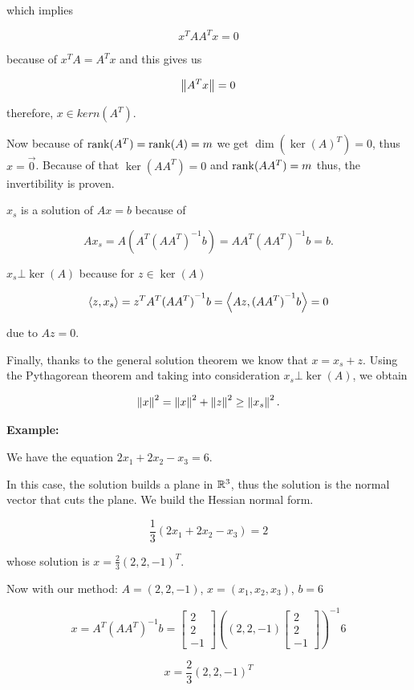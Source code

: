 which implies 

\[
	x^T AA^T x = 0
\] 

because of \(x^T A = A^T x\) and this gives us 

\[
	\left\| A^T x \right\| = 0
\] 

therefore, \(x \in kern(A^T)\).

Now because of \(\mathrm{rank}(A^T) = \mathrm{rank}(A) = m\) we get \(\dim(\ker(A)^T) = 0\), thus \(x = \vec{0}\). 
Because of that \(\ker(A A^T) = 0\) and \(\mathrm{rank}(AA^T) = m\) thus, the invertibility is proven.

\(x_s\) is a solution of \(Ax = b\) because of 

\[
	Ax_s = A(A^T {(A A^T)}^{-1} b) = AA^T {(A A^T)}^{-1} b = b.
\]

\(x_s \bot \ker(A)\) because for \(z \in \ker(A)\)

\[
	\left\langle z, x_s\right\rangle = z^T A^T {(A A^T)}^{-1} b = \left\langle Az, {(A A^T)}^{-1} b\right\rangle = 0
\]

due to \(Az = 0\).

Finally, thanks to the general solution theorem we know that \(x = x_s + z\). Using the Pythagorean theorem and 
taking into consideration \(x_s \bot \ker(A)\), we obtain

\[
	\left\| x \right\|^2 = \left\| x \right\|^2 + \left\| z \right\|^2 \ge \left\| x_s \right\|^2.
\]

\textbf{Example:}

We have the equation \(2x_1 + 2x_2 - x_3 = 6\).

In this case, the solution builds a plane in \(\mathbb{R}^3\), thus the solution is the normal vector that 
cuts the plane. We build the Hessian normal form.

\[
	\frac{1}{3} (2x_1 + 2x_2 - x_3) = 2
\]

whose solution is \(x = \frac{2}{3}(2, 2, -1)^T\).

Now with our method: \(A = (2, 2, -1)\), \(x = (x_1, x_2, x_3)\), \(b = 6\)

\[
	x = A^T {(AA^T)}^{-1} b =
	\begin{bmatrix}
	2\\
	2\\
	-1
	\end{bmatrix}
	{\left(
		(2,2,-1)
	\begin{bmatrix}
	2\\
	2\\
	-1		
	\end{bmatrix}
	\right)}^{-1}
	6
\]

\[
	x = \frac{2}{3}(2, 2, -1)^T
\]

